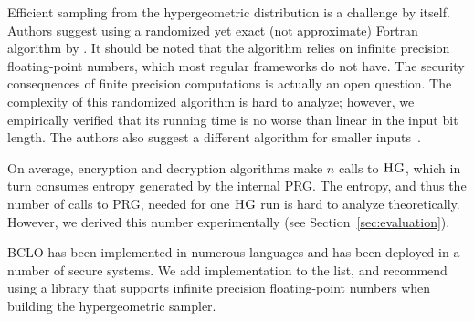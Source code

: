 		Efficient sampling from the hypergeometric distribution is a challenge by itself.
		Authors suggest using a randomized yet exact (not approximate) Fortran algorithm by \textcite{hg-sampler}.
		It should be noted that the algorithm relies on infinite precision floating-point numbers, which most regular frameworks do not have.
		The security consequences of finite precision computations is actually an open question.
		The complexity of this randomized algorithm is hard to analyze; however, we empirically verified that its running time is no worse than linear in the input bit length.
		The authors also suggest a different algorithm for smaller inputs~\cite{hg-sampler-small}.

		On average, encryption and decryption algorithms make $n$ calls to $\textsc{HG}$, which in turn consumes entropy generated by the internal PRG\@.
		The entropy, and thus the number of calls to PRG, needed for one $\textsc{HG}$ run is hard to analyze theoretically.
		However, we derived this number experimentally (see Section~\ref{sec:evaluation}).

		BCLO has been implemented in numerous languages and has been deployed in a number of secure systems.
		We add {\Csharp} implementation to the list, and recommend using a library that supports infinite precision floating-point numbers when building the hypergeometric sampler.
